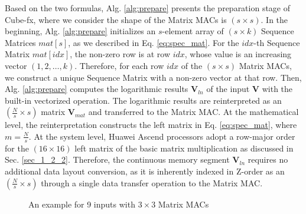 Based on the two formulas, Alg. \ref{alg:prepare} presents the preparation stage of Cube-fx, where we consider the shape of the Matrix MACs is $(s \times s)$. In the beginning, Alg. \ref{alg:prepare} initializes an $s$-element array of $(s \times k)$ Sequence Matrices $mat[s]$, as we described in Eq. \ref{eq:spec_mat}. For the $idx$-th Sequence Matrix $mat[idx]$, the non-zero row is at row $idx$, whose value is an increasing vector $(1, 2, \dots, k)$. Therefore, for each row $idx$ of the $(s \times s)$ Matrix MACs, we construct a unique Sequence Matrix with a non-zero vector at that row. Then, Alg. \ref{alg:prepare} computes the logarithmic results $\textbf{V}_{ln}$ of the input $\textbf{V}$ with the built-in vectorized operation. The logarithmic results are reinterpreted as an $(\frac{N}{s} \times s)$ matrix $\textbf{V}_{mat}$ and transferred to the Matrix MAC. 
At the mathematical level, the reinterpretation constructs the left matrix in Eq. \ref{eq:spec_mat}, where $m = \frac{N}{s}$. At the system level, Huawei Ascend processors adopt a row-major order for the $(16 \times 16)$ left matrix of the basic matrix multiplication as discussed in Sec. \ref{sec_1_2_2}. Therefore, the continuous memory segment $\textbf{V}_{ln}$ requires no additional data layout conversion, as it is inherently indexed in Z-order as an $(\frac{N}{s} \times s)$ through a single data transfer operation to the Matrix MAC.

\begin{figure}[t]
    \caption{An example for 9 inputs with $3 \times 3$ Matrix MACs}
    \label{fig:trans_ln}
    \end{figure}

